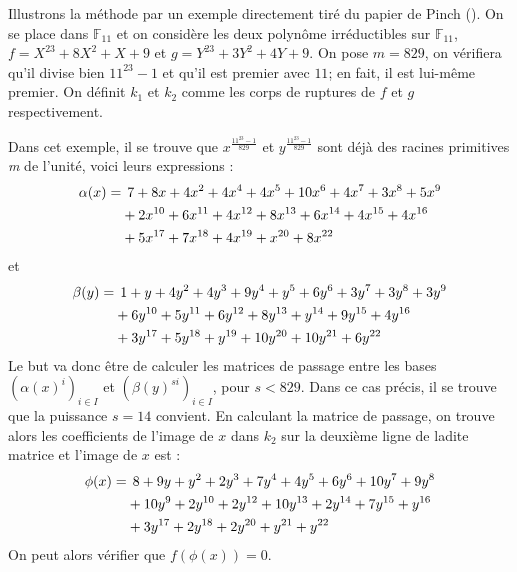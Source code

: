 \documentclass[a4paper]{article} %
\numberwithin{section}{part}
\numberwithin{equation}{section}
\newcommand\nroot[1]{\textit{#1}\up{\textit{ième}}}
\newcommand\GF[1]{\mathbb{F}_{#1}}
\begin{document}
\begin{ex}
Illustrons la méthode par un exemple directement tiré du papier de Pinch
(\cite{Pin}). On se place dans $\GF{11}$ et on considère les deux polynôme
irréductibles sur $\GF{11}$, $f = X^{23} + 8X^2 + X + 9$ et $g = Y^{23} + 3Y^2 +
4Y + 9$. On pose $m = 829$, on vérifiera qu'il divise bien $11^{23} - 1$ et 
qu'il est premier avec $11$; en fait, il est lui-même premier. On définit $k_1$ 
et $k_2$ comme les corps de ruptures de $f$ et $g$ respectivement.\par
Dans cet exemple, il se trouve que $x^{\tfrac{11^{23} - 1}{829}}$ et 
$y^{\tfrac{11^{23} - 1}{829}}$ sont déjà des racines primitives \nroot{m} de 
l'unité, voici leurs expressions :
\begin{align*}
\alpha(x) =&\hspace{0.15cm} 7 + 8x + 4x^2 + 4x^4 + 4x^5 + 10x^6 + 4x^7 + 3x^8 + 
5x^9\\
& + 2x^{10} + 6x^{11} + 4x^{12} + 8x^{13} + 6x^{14} + 4x^{15} + 4x^{16}\\
& + 5x^{17}  + 7x^{18} + 4x^{19} + x^{20} + 8x^{22}
\end{align*}
et
\begin{align*}
\beta(y) =&\hspace{0.15cm}1 + y + 4y^2 + 4y^3 + 9y^4 + y^5 + 6y^6 + 3y^7 + 3y^8 
+ 3y^9\\
& + 6y^{10} + 5y^{11} + 6y^{12} + 8y^{13} + y^{14} + 9y^{15} + 4y^{16}\\
& + 3y^{17} + 5y^{18} + y^{19} + 10y^{20} + 10y^{21} + 6y^{22}
\end{align*}
Le but va donc être de calculer les matrices de passage entre les bases
$(\alpha(x)^i)_{i\in I}$ et $(\beta(y)^{si})_{i\in I}$, pour $s < 829$.
Dans ce cas précis, il se trouve que la puissance $s = 14$ convient. En 
calculant la matrice de passage, on trouve alors les coefficients de l'image de 
$x$ dans $k_2$ sur la deuxième ligne de ladite matrice et l'image de $x$ est :
\begin{align*}
\phi(x) =&\hspace{0.15cm} 8 + 9y + y^2 + 2y^3 + 7y^4 + 4y^5 + 6y^6 + 10y^7 + 
9y^8\\
& + 10y^9 + 2y^{10} + 2y^{12} + 10y^{13} + 2y^{14} + 7y^{15} + y^{16}\\
& + 3y^{17} + 2y^{18} + 2y^{20} + y^{21} + y^{22}
\end{align*}
On peut alors vérifier que $f(\phi(x)) = 0$.
\end{ex}
\end{document}
